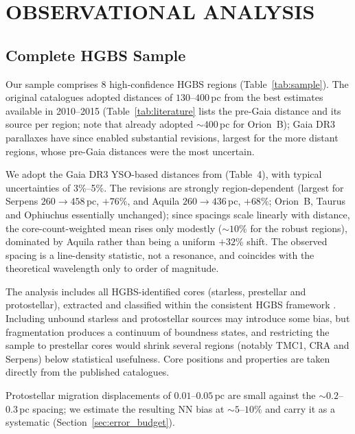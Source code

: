 \documentclass[usenatbib,twoside,twocolumn]{mnras}
\begin{document}
\section{OBSERVATIONAL ANALYSIS}

\subsection{Complete HGBS Sample}

Our sample comprises 8 high-confidence HGBS regions (Table~\ref{tab:sample}). The original catalogues \citep{Konyves2015, Konyves2020, Ladjelate2020, Pezzuto2021} adopted distances of $130$--$400$\,pc from the best estimates available in 2010--2015 (Table~\ref{tab:literature} lists the pre-Gaia distance and its source per region; note that \citealt{Konyves2020} already adopted $\sim400$\,pc for Orion~B); Gaia DR3 parallaxes \citep{Zhang2023} have since enabled substantial revisions, largest for the more distant regions, whose pre-Gaia distances were the most uncertain.

We adopt the Gaia DR3 YSO-based distances from \citet{Zhang2023} (Table~4), with typical uncertainties of 3\%--5\%. The revisions are strongly region-dependent (largest for Serpens $260\to458$\,pc, $+76\%$, and Aquila $260\to436$\,pc, $+68\%$; Orion~B, Taurus and Ophiuchus essentially unchanged); since spacings scale linearly with distance, the core-count-weighted mean rises only modestly ($\sim10\%$ for the robust regions), dominated by Aquila rather than being a uniform $+32\%$ shift. The observed spacing is a line-density statistic, not a resonance, and coincides with the theoretical wavelength only to order of magnitude.

The analysis includes all HGBS-identified cores (starless, prestellar and protostellar), extracted and classified within the consistent HGBS framework \citep{Konyves2015, Konyves2020}. Including unbound starless and protostellar sources may introduce some bias, but fragmentation produces a continuum of boundness states, and restricting the sample to prestellar cores would shrink several regions (notably TMC1, CRA and Serpens) below statistical usefulness. Core positions and properties are taken directly from the published catalogues.

Protostellar migration displacements of $0.01$--$0.05$\,pc \citep{Kirk2016, Mattern2018} are small against the $\sim0.2$--$0.3$\,pc spacing; we estimate the resulting NN bias at $\sim5$--$10\%$ and carry it as a systematic (Section~\ref{sec:error_budget}).
\end{document}

